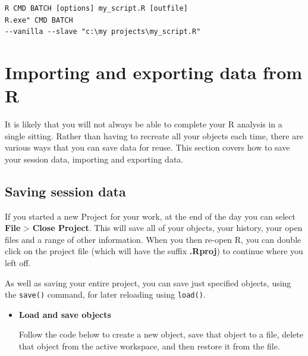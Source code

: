 \documentclass[a4paper]{book}
\newenvironment{rmdblock}[1]
  {\vspace{1.5em}\begin{shaded*}
  \begin{itemize}
  \renewcommand{\labelitemi}{
    \raisebox{-.7\height}[0pt][0pt]{
      {\setkeys{Gin}{width=3em,keepaspectratio}\texttt{[image: images/\#1]}}
    }
  }
  \item
  }
  {
  \end{itemize}
  \end{shaded*}
  }
\newenvironment{rmdexercise}
  {\begin{rmdblock}{exercise}}
  {\end{rmdblock}}
\begin{document}
\begin{verbatim}
R CMD BATCH [options] my_script.R [outfile]
R.exe" CMD BATCH
--vanilla --slave "c:\my projects\my_script.R"
\end{verbatim}

\chapter{Importing and exporting data from
R}\label{importing-and-exporting-data-from-r}

It is likely that you will not always be able to complete your R
analysis in a single sitting. Rather than having to recreate all your
objects each time, there are various ways that you can save data for
reuse. This section covers how to save your session data, importing and
exporting data.

\section{Saving session data}\label{saving-session-data}

If you started a new Project for your work, at the end of the day you
can select \textbf{File} \textgreater{} \textbf{Close Project}. This
will save all of your objects, your history, your open files and a range
of other information. When you then re-open R, you can double click on
the project file (which will have the suffix \textbf{.Rproj}) to
continue where you left off.

As well as saving your entire project, you can save just specified
objects, using the \texttt{save()} command, for later reloading using
\texttt{load()}.

\begin{rmdexercise}
\textbf{Load and save objects}

Follow the code below to create a new object, save that object to a
file, delete that object from the active workspace, and then restore it
from the file.
\end{rmdexercise}
\end{document}

